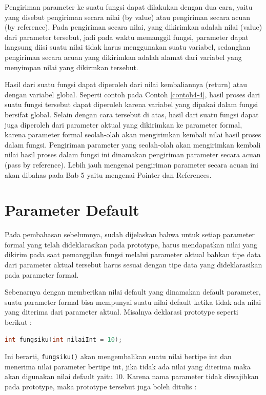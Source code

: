 Pengiriman parameter ke suatu fungsi dapat dilakukan dengan dua cara,
yaitu yang disebut pengiriman secara nilai (by value) atau pengiriman
secara acuan (by reference). Pada pengiriman secara nilai, yang
dikirimkan adalah nilai (value) dari parameter tersebut, jadi pada waktu
memanggil fungsi, parameter dapat langsung diisi suatu nilai tidak harus
menggunakan suatu variabel, sedangkan pengiriman secara acuan yang
dikirimkan adalah alamat dari variabel yang menyimpan nilai yang
dikirmkan tersebut.

Hasil dari suatu fungsi dapat diperoleh dari nilai kembaliannya (return)
atau dengan variabel global. Seperti contoh pada Contoh \ref{contoh4-4}, hasil proses
dari suatu fungsi tersebut dapat diperoleh karena variabel yang dipakai
dalam fungsi bersifat global. Selain dengan cara tersebut di atas, hasil
dari suatu fungsi dapat juga diperoleh dari parameter aktual yang
dikirimkan ke parameter formal, karena parameter formal seolah-olah akan
mengirimkan kembali nilai hasil proses dalam fungsi. Pengiriman
parameter yang seolah-olah akan mengirimkan kembali nilai hasil proses
dalam fungsi ini dinamakan pengiriman parameter secara acuan (pass by
reference). Lebih jauh mengenai pengiriman parameter secara acuan ini
akan dibahas pada Bab 5 yaitu mengenai Pointer dan References.

\section{Parameter Default}\label{parameter-default}

Pada pembahasan sebelumnya, sudah dijelaskan bahwa untuk setiap
parameter formal yang telah dideklarasikan pada prototype, harus
mendapatkan nilai yang dikirim pada saat pemanggilan fungsi melalui
parameter aktual bahkan tipe data dari parameter aktual tersebut harus
sesuai dengan tipe data yang dideklarasikan pada parameter formal.

Sebenarnya dengan memberikan nilai default yang dinamakan default
parameter, suatu parameter formal bisa mempunyai suatu nilai default
ketika tidak ada nilai yang diterima dari parameter aktual. Misalnya
deklarasi prototype seperti berikut :

\begin{lstlisting}[language=c++, numbers=none]
int fungsiku(int nilaiInt = 10);
\end{lstlisting}

Ini berarti, \texttt{fungsiku()} akan mengembalikan suatu nilai bertipe
int dan menerima nilai parameter bertipe int, jika tidak ada nilai yang
diterima maka akan digunakan nilai default yaitu 10. Karena nama
parameter tidak diwajibkan pada prototype, maka prototype tersebut juga
boleh ditulis :

